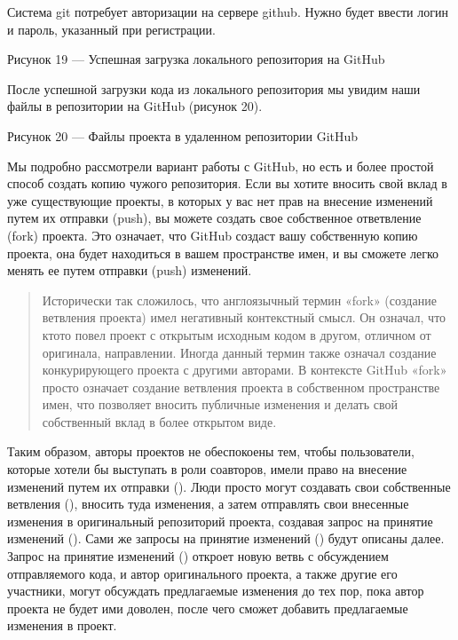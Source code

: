 \documentclass[letterpaper,10pt,russian]{sphinxmanual}
\begin{document}
\sphinxAtStartPar
Система git потребует авторизации на сервере github. Нужно будет ввести логин и пароль, указанный при регистрации.

\sphinxAtStartPar
{}

\sphinxAtStartPar
Рисунок 19 — Успешная загрузка локального репозитория на GitHub

\sphinxAtStartPar
После успешной загрузки кода из локального репозитория мы увидим наши файлы в репозитории на GitHub (рисунок 20).

\sphinxAtStartPar
{}

\sphinxAtStartPar
Рисунок 20 — Файлы проекта в удаленном репозитории GitHub

\sphinxAtStartPar
{}

\sphinxAtStartPar
Мы подробно рассмотрели вариант работы с GitHub, но есть и более простой способ создать копию чужого репозитория. Если вы хотите вносить свой вклад в уже существующие проекты, в которых у вас нет прав на внесение изменений путем их отправки (push), вы можете создать свое собственное ответвление (fork) проекта. Это означает, что GitHub создаст вашу собственную копию проекта, она будет находиться в вашем пространстве имен, и вы сможете легко менять ее путем отправки (push) изменений.
\begin{quote}

\sphinxAtStartPar
{}
Исторически так сложилось, что англоязычный термин «fork» (создание ветвления проекта) имел негативный контекстный смысл. Он означал, что кто\sphinxhyphen{}то повел проект с открытым исходным кодом в другом, отличном от оригинала, направлении. Иногда данный термин также означал создание конкурирующего проекта с другими авторами. В контексте GitHub «fork» просто означает создание ветвления проекта в собственном пространстве имен, что позволяет вносить публичные изменения и делать свой собственный вклад в более открытом виде.
\end{quote}

\sphinxAtStartPar
Таким образом, авторы проектов не обеспокоены тем, чтобы пользователи, которые хотели бы выступать в роли соавторов, имели право на внесение изменений путем их отправки (). Люди просто могут создавать свои собственные ветвления (), вносить туда изменения, а затем отправлять свои внесенные изменения в оригинальный репозиторий проекта, создавая запрос на принятие изменений (). Сами же запросы на принятие изменений () будут описаны далее. Запрос на принятие изменений () откроет новую ветвь с обсуждением отправляемого кода, и автор оригинального проекта, а также другие его участники, могут обсуждать предлагаемые изменения до тех пор, пока автор проекта не будет ими доволен, после чего сможет добавить предлагаемые изменения в проект.
\end{document}
